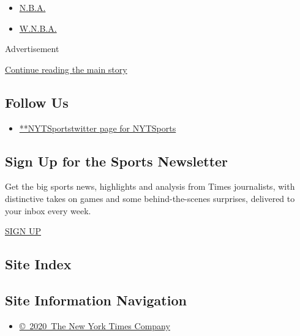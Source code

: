 \begin{itemize}
\tightlist
\item
  \protect\hyperlink{}{N.B.A.}
\item
  \protect\hyperlink{}{W.N.B.A.}
\end{itemize}

Advertisement

\protect\hyperlink{after-mktg}{Continue reading the main story}

\hypertarget{follow-us}{%
\subsection{Follow Us}\label{follow-us}}

\begin{itemize}
\tightlist
\item
  \href{https://twitter.com/NYTSports}{**NYTSportstwitter page for
  NYTSports}
\end{itemize}

\hypertarget{sign-up-for-the-sports-newsletter}{%
\subsection{Sign Up for the Sports
Newsletter}\label{sign-up-for-the-sports-newsletter}}

Get the big sports news, highlights and analysis from Times journalists,
with distinctive takes on games and some behind-the-scenes surprises,
delivered to your inbox every week.

\href{/newsletters/signup/SP}{SIGN UP}

\hypertarget{site-index}{%
\subsection{Site Index}\label{site-index}}

\hypertarget{site-information-navigation}{%
\subsection{Site Information
Navigation}\label{site-information-navigation}}

\begin{itemize}
\tightlist
\item
  \href{https://help.nytimes3xbfgragh.onion/hc/en-us/articles/115014792127-Copyright-notice}{©~2020~The
  New York Times Company}
\end{itemize}

